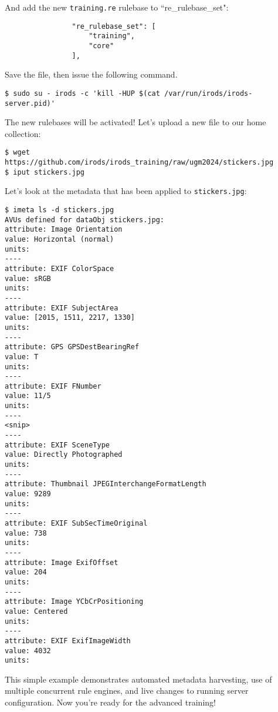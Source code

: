 \documentclass[10pt,oneside]{memoir}
\begin{document}
And add the new \texttt{training.re} rulebase to ``re\_rulebase\_set":

\begin{lrbox}{\lstServerConfigB}
\begin{lstlisting}
                "re_rulebase_set": [
                    "training",
                    "core"
                ],
\end{lstlisting}
\end{lrbox}
\href{https://github.com/irods/irods_training/blob/ugm2024/beginner/server_config.json#L56-L59}{\usebox{\lstServerConfigB}}

Save the file, then issue the following command.

\begin{lstlisting}
$ sudo su - irods -c 'kill -HUP $(cat /var/run/irods/irods-server.pid)'
\end{lstlisting}

The new rulebases will be activated!  Let's upload a new file to our home collection:

\begin{lstlisting}
$ wget https://github.com/irods/irods_training/raw/ugm2024/stickers.jpg
$ iput stickers.jpg
\end{lstlisting}

\newpage

Let's look at the metadata that has been applied to \texttt{stickers.jpg}:

\begin{lstlisting}
$ imeta ls -d stickers.jpg
AVUs defined for dataObj stickers.jpg:
attribute: Image Orientation
value: Horizontal (normal)
units:
----
attribute: EXIF ColorSpace
value: sRGB
units:
----
attribute: EXIF SubjectArea
value: [2015, 1511, 2217, 1330]
units:
----
attribute: GPS GPSDestBearingRef
value: T
units:
----
attribute: EXIF FNumber
value: 11/5
units:
----
<snip>
----
attribute: EXIF SceneType
value: Directly Photographed
units:
----
attribute: Thumbnail JPEGInterchangeFormatLength
value: 9289
units:
----
attribute: EXIF SubSecTimeOriginal
value: 738
units:
----
attribute: Image ExifOffset
value: 204
units:
----
attribute: Image YCbCrPositioning
value: Centered
units:
----
attribute: EXIF ExifImageWidth
value: 4032
units:
\end{lstlisting}


This simple example demonstrates automated metadata harvesting, use of multiple concurrent rule engines, and live changes to running server configuration.  Now you're ready for the advanced training!
\end{document}
